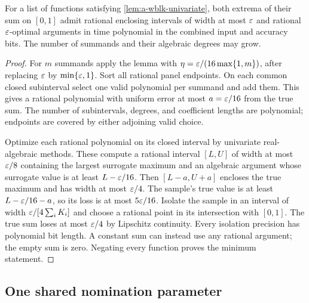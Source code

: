 \begin{corollary}
\label{cor:a-wblk-scalar-sum}
For a list of functions satisfying \cref{lem:a-wblk-univariate}, both
extrema of their sum on $[0,1]$ admit rational enclosing intervals of
width at most $\varepsilon$ and rational $\varepsilon$-optimal arguments in time
polynomial in the combined input and accuracy bits. The number of
summands and their algebraic degrees may grow.
\end{corollary}
\begin{proof}
For $m$ summands apply the lemma with $\eta=\varepsilon/(16\max\{1,m\})$,
after replacing $\varepsilon$ by $\min\{\varepsilon,1\}$. Sort all rational panel
endpoints. On each common closed subinterval select one valid polynomial
per summand and add them. This gives a rational polynomial with uniform
error at most $a=\varepsilon/16$ from the true sum. The number of subintervals,
degrees, and coefficient lengths are polynomial; endpoints are covered
by either adjoining valid choice.

Optimize each rational polynomial on its closed interval by univariate
real-algebraic methods. These compute a rational interval $[L,U]$ of
width at most $\varepsilon/8$ containing the largest surrogate maximum and an
algebraic argument whose surrogate value is at least $L-\varepsilon/16$.
Then $[L-a,U+a]$ encloses the true maximum and has width at most
$\varepsilon/4$. The sample's true value is at least $L-\varepsilon/16-a$, so its
loss is at most $5\varepsilon/16$. Isolate the sample in an interval of width
$\varepsilon/[4\sum_i K_i]$ and choose a rational point in its intersection
with $[0,1]$. The true sum loses at most $\varepsilon/4$ by Lipschitz
continuity. Every isolation precision has polynomial bit length. A
constant sum can instead use any rational argument; the empty sum is
zero. Negating every function proves the minimum statement.
\end{proof}

\subsection{One shared nomination parameter}

